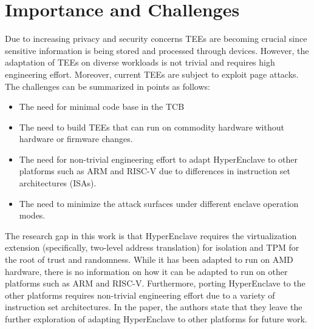 \section {Importance and Challenges}
Due to increasing privacy and security concerns TEEs are becoming crucial since sensitive information is being stored and processed through devices. However, the adaptation of TEEs on diverse workloads is not trivial and requires high engineering effort. Moreover, current TEEs are subject to exploit page attacks. The challenges can be summarized in points as follows: 
\begin{itemize}
    \item The need for minimal code base in the TCB
    \item The need to build TEEs that can run on commodity hardware without hardware or firmware changes.
    \item The need for non-trivial engineering effort to adapt HyperEnclave to other platforms such as ARM and RISC-V due to differences in instruction set architectures (ISAs).
    \item The need to minimize the attack surfaces under different enclave operation modes.
\end{itemize}

The research gap in this work is that HyperEnclave requires the virtualization extension (specifically, two-level address translation) for isolation and TPM for the root of trust and randomness. While it has been adapted to run on AMD hardware, there is no information on how it can be adapted to run on other platforms such as ARM and RISC-V. Furthermore, porting HyperEnclave to the other platforms requires non-trivial engineering effort due to a variety of instruction set architectures. In the paper, the authors state that they leave the further exploration of adapting HyperEnclave to other platforms for future work. 


